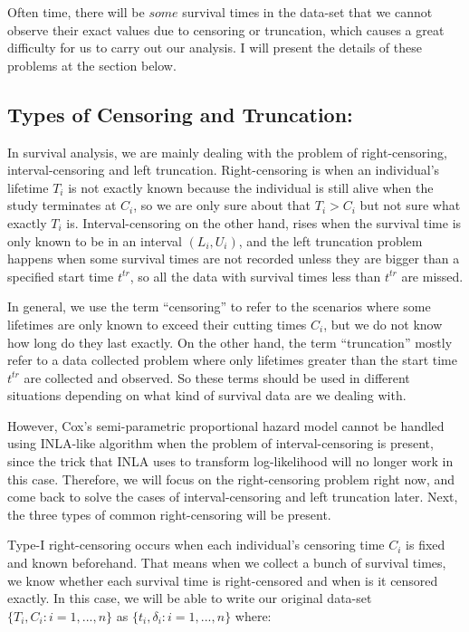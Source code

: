 \documentclass[]{article}
\begin{document}
Often time, there will be \(some\) survival times in the data-set that
we cannot observe their exact values due to censoring or truncation,
which causes a great difficulty for us to carry out our analysis. I will
present the details of these problems at the section below.

\hypertarget{types-of-censoring-and-truncation}{%
\subsection{Types of Censoring and
Truncation:}\label{types-of-censoring-and-truncation}}

In survival analysis, we are mainly dealing with the problem of
right-censoring, interval-censoring and left truncation. Right-censoring
is when an individual's lifetime \(T_i\) is not exactly known because
the individual is still alive when the study terminates at \(C_i\), so
we are only sure about that \(T_i > C_i\) but not sure what exactly
\(T_i\) is. Interval-censoring on the other hand, rises when the
survival time is only known to be in an interval \((L_i,U_i)\), and the
left truncation problem happens when some survival times are not
recorded unless they are bigger than a specified start time \(t^{tr}\),
so all the data with survival times less than \(t^{tr}\) are missed.

In general, we use the term ``censoring'' to refer to the scenarios
where some lifetimes are only known to exceed their cutting times
\(C_i\), but we do not know how long do they last exactly. On the other
hand, the term ``truncation'' mostly refer to a data collected problem
where only lifetimes greater than the start time \(t^{tr}\) are
collected and observed. So these terms should be used in different
situations depending on what kind of survival data are we dealing with.

However, Cox's semi-parametric proportional hazard model cannot be
handled using INLA-like algorithm when the problem of interval-censoring
is present, since the trick that INLA uses to transform log-likelihood
will no longer work in this case. Therefore, we will focus on the
right-censoring problem right now, and come back to solve the cases of
interval-censoring and left truncation later. Next, the three types of
common right-censoring will be present.

Type-I right-censoring occurs when each individual's censoring time
\(C_i\) is fixed and known beforehand. That means when we collect a
bunch of survival times, we know whether each survival time is
right-censored and when is it censored exactly. In this case, we will be
able to write our original data-set \(\{ T_i,C_i:i=1,...,n \}\) as
\(\{ t_i,\delta_i:i=1,...,n \}\) where:
\end{document}
